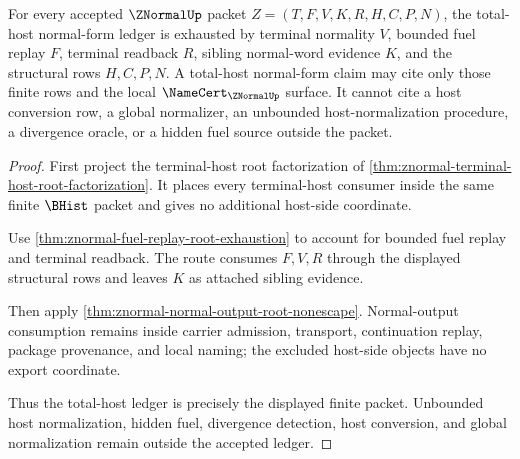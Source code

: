 \begin{theorem}
\label{thm:znormal-total-host-normal-form-ledger-exhaustion}
For every accepted $\ZNormalUp$ packet $Z=(T,F,V,K,R,H,C,P,N)$, the total-host normal-form ledger is exhausted by terminal normality $V$, bounded fuel replay $F$, terminal readback $R$, sibling normal-word evidence $K$, and the structural rows $H,C,P,N$. A total-host normal-form claim may cite only those finite rows and the local $\NameCert_{\ZNormalUp}$ surface. It cannot cite a host conversion row, a global normalizer, an unbounded host-normalization procedure, a divergence oracle, or a hidden fuel source outside the packet.
\end{theorem}
\begin{proof}
First project the terminal-host root factorization of \autoref{thm:znormal-terminal-host-root-factorization}. It places every terminal-host consumer inside the same finite $\BHist$ packet and gives no additional host-side coordinate.

Use \autoref{thm:znormal-fuel-replay-root-exhaustion} to account for bounded fuel replay and terminal readback. The route consumes $F,V,R$ through the displayed structural rows and leaves $K$ as attached sibling evidence.

Then apply \autoref{thm:znormal-normal-output-root-nonescape}. Normal-output consumption remains inside carrier admission, transport, continuation replay, package provenance, and local naming; the excluded host-side objects have no export coordinate.

Thus the total-host ledger is precisely the displayed finite packet. Unbounded host normalization, hidden fuel, divergence detection, host conversion, and global normalization remain outside the accepted ledger.
\end{proof}

